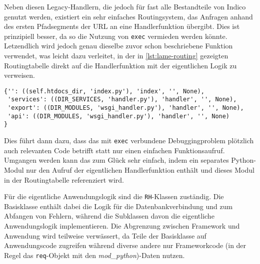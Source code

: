 Neben diesen Legacy-Handlern, die jedoch für fast alle Bestandteile von Indico genutzt werden,
existiert ein sehr einfaches Routingsystem, das Anfragen anhand des ersten Pfadsegments der URL an
eine Handlerfunktion übergibt. Dies ist prinzipiell besser, da so die Nutzung von \lstinline{exec}
vermieden werden könnte. Letzendlich wird jedoch genau dieselbe zuvor schon
beschriebene Funktion verwendet, was leicht dazu verleitet, in der in \autoref{lst:lame-routing}
gezeigten Routingtabelle direkt auf die Handlerfunktion mit der eigentlichen Logik zu verweisen.

\begin{lstlisting}[caption=Einfaches URL-Routing,label=lst:lame-routing]
{'': ((self.htdocs_dir, 'index.py'), 'index', '', None),
 'services': ((DIR_SERVICES, 'handler.py'), 'handler', '', None),
 'export': ((DIR_MODULES, 'wsgi_handler.py'), 'handler', '', None),
 'api': ((DIR_MODULES, 'wsgi_handler.py'), 'handler', '', None)
}
\end{lstlisting}

Dies führt dann dazu, dass das mit \lstinline{exec} verbundene Debuggingproblem plötzlich
auch relevanten Code betrifft statt nur einen einfachen Funktionsaufruf. Umgangen werden kann das
zum Glück sehr einfach, indem ein separates Python-Modul nur den Aufruf der eigentlichen
Handlerfunktion enthält und dieses Modul in der Routingtabelle referenziert wird.

Für die eigentliche Anwendungslogik sind die \lstinline{RH}-Klassen zuständig. Die Basisklasse
enthält dabei die Logik für die Datenbankverbindung und zum Abfangen von Fehlern, während die
Subklassen davon die eigentliche Anwendungslogik implementieren. Die Abgrenzung zwischen Framework
und Anwendung wird teilweise verwässert, da Teile der Basisklasse auf Anwendungscode zugreifen
während diverse andere nur Frameworkcode (in der Regel das \lstinline{req}-Objekt mit den
\emph{mod\_python})-Daten nutzen.

